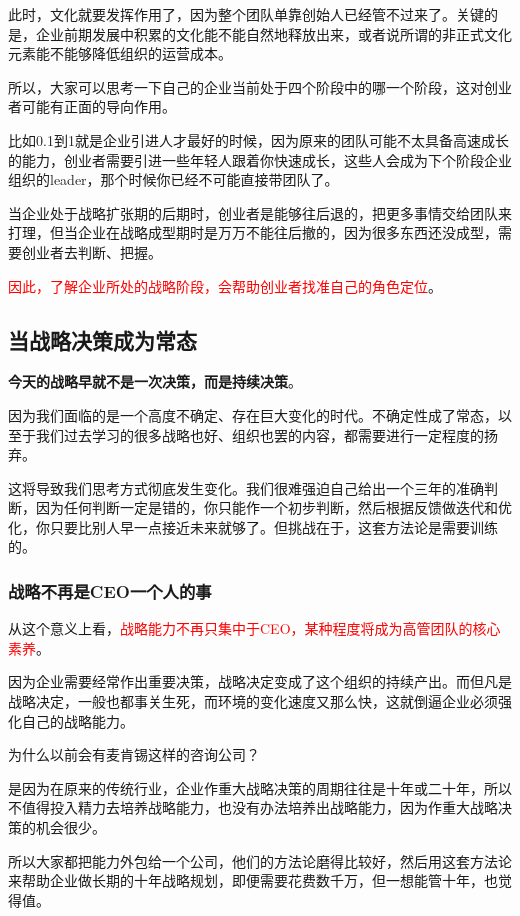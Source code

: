 \documentclass[12pt]{article}
\begin{document}
此时，文化就要发挥作用了，因为整个团队单靠创始人已经管不过来了。关键的是，企业前期发展中积累的文化能不能自然地释放出来，或者说所谓的非正式文化元素能不能够降低组织的运营成本。

所以，大家可以思考一下自己的企业当前处于四个阶段中的哪一个阶段，这对创业者可能有正面的导向作用。

比如0.1到1就是企业引进人才最好的时候，因为原来的团队可能不太具备高速成长的能力，创业者需要引进一些年轻人跟着你快速成长，这些人会成为下个阶段企业组织的leader，那个时候你已经不可能直接带团队了。

当企业处于战略扩张期的后期时，创业者是能够往后退的，把更多事情交给团队来打理，但当企业在战略成型期时是万万不能往后撤的，因为很多东西还没成型，需要创业者去判断、把握。

\textcolor{red}{因此，了解企业所处的战略阶段，会帮助创业者找准自己的角色定位}。

\subsection{当战略决策成为常态}
\textbf{今天的战略早就不是一次决策，而是持续决策}。

因为我们面临的是一个高度不确定、存在巨大变化的时代。不确定性成了常态，以至于我们过去学习的很多战略也好、组织也罢的内容，都需要进行一定程度的扬弃。

这将导致我们思考方式彻底发生变化。我们很难强迫自己给出一个三年的准确判断，因为任何判断一定是错的，你只能作一个初步判断，然后根据反馈做迭代和优化，你只要比别人早一点接近未来就够了。但挑战在于，这套方法论是需要训练的。

\subsubsection{战略不再是CEO一个人的事}
从这个意义上看，\textcolor{red}{战略能力不再只集中于CEO，某种程度将成为高管团队的核心素养}。

因为企业需要经常作出重要决策，战略决定变成了这个组织的持续产出。而但凡是战略决定，一般也都事关生死，而环境的变化速度又那么快，这就倒逼企业必须强化自己的战略能力。

为什么以前会有麦肯锡这样的咨询公司？

是因为在原来的传统行业，企业作重大战略决策的周期往往是十年或二十年，所以不值得投入精力去培养战略能力，也没有办法培养出战略能力，因为作重大战略决策的机会很少。

所以大家都把能力外包给一个公司，他们的方法论磨得比较好，然后用这套方法论来帮助企业做长期的十年战略规划，即便需要花费数千万，但一想能管十年，也觉得值。
\end{document}
